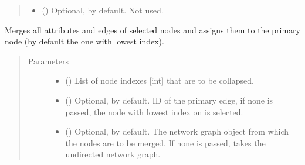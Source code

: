 \documentclass[letterpaper,10pt,english]{sphinxmanual}
\begin{document}
\begin{fulllineitems}
\begin{fulllineitems}
\begin{quote}
\begin{description}
\begin{itemize}
\item {} 
 () \textendash{} Optional,  by default. Not used.

\end{itemize}

\end{description}\end{quote}

\end{fulllineitems}


\begin{fulllineitems}
\label{\detokenize{reference:pypath.main.PyPath.merge_nodes}}
Merges all attributes and edges of selected nodes and assigns
them to the primary node (by default the one with lowest index).
\begin{quote}\begin{description}
\item[{Parameters}] \leavevmode\begin{itemize}
\item {} 
 () \textendash{} List of node indexes {[}int{]} that are to be collapsed.

\item {} 
 () \textendash{} Optional,  by default. ID of the primary edge, if
none is passed, the node with lowest index on  is
selected.

\item {} 
 () \textendash{} Optional,  by default. The network graph object from
which the nodes are to be merged. If none is passed, takes
the undirected network graph.

\end{itemize}

\end{description}\end{quote}


\end{fulllineitems}
\end{fulllineitems}
\end{document}
